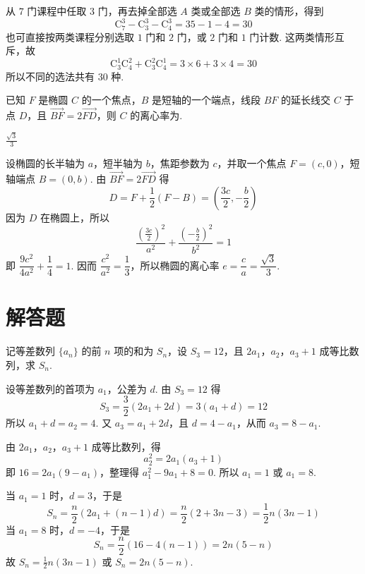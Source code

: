 \begin{solution}
从 \(7\) 门课程中任取 \(3\) 门，再去掉全部选 \(A\) 类或全部选 \(B\) 类的情形，得到
\[
\mathrm C_7^3-\mathrm C_3^3-\mathrm C_4^3=35-1-4=30
\]
也可直接按两类课程分别选取 \(1\) 门和 \(2\) 门，或 \(2\) 门和 \(1\) 门计数. 这两类情形互斥，故
\[
\mathrm C_3^1\mathrm C_4^2+\mathrm C_3^2\mathrm C_4^1=3\times6+3\times4=30
\]
所以不同的选法共有 \(30\) 种.
\end{solution}

\begin{problem}
已知 \(F\) 是椭圆 \(C\) 的一个焦点，\(B\) 是短轴的一个端点，线段 \(BF\) 的延长线交 \(C\) 于点 \(D\)，且 \( \overrightarrow{BF} = 2\overrightarrow{FD} \)，则 \(C\) 的离心率为\fillinblank{}.
\end{problem}

\begin{answer}
\(\frac{\sqrt{3}}{3}\)
\end{answer}

\begin{solution}
设椭圆的长半轴为 \(a\)，短半轴为 \(b\)，焦距参数为 \(c\)，并取一个焦点
\(F=(c,0)\)，短轴端点 \(B=(0,b)\). 由
\(\overrightarrow{BF}=2\overrightarrow{FD}\) 得
\[
D=F+\frac12(F-B)=\left(\frac{3c}{2},-\frac b2\right)
\]
因为 \(D\) 在椭圆上，所以
\[
\frac{\left(\frac{3c}{2}\right)^2}{a^2}
+\frac{\left(-\frac b2\right)^2}{b^2}=1
\]
即 \(\dfrac{9c^2}{4a^2}+\dfrac14=1\). 因而
\(\dfrac{c^2}{a^2}=\dfrac13\)，所以椭圆的离心率
\(e=\dfrac ca=\dfrac{\sqrt3}{3}\).
\end{solution}

\section{解答题}

\begin{problem}
记等差数列 \(\{a_{n}\}\) 的前 \(n\) 项的和为 \(S_{n}\)，设 \(S_{3} = 12\)，且 \(2a_{1}\)，\(a_{2}\)，\(a_{3} + 1\) 成等比数列，求 \(S_{n}\).
\end{problem}

\begin{solution}
设等差数列的首项为 \(a_1\)，公差为 \(d\). 由 \(S_3=12\) 得
\[
S_3=\frac32\left(2a_1+2d\right)=3(a_1+d)=12
\]
所以 \(a_1+d=a_2=4\). 又
\(a_3=a_1+2d\)，且 \(d=4-a_1\)，从而 \(a_3=8-a_1\).

由 \(2a_1\)，\(a_2\)，\(a_3+1\) 成等比数列，得
\[
a_2^2=2a_1(a_3+1)
\]
即 \(16=2a_1(9-a_1)\)，整理得 \(a_1^2-9a_1+8=0\).
所以 \(a_1=1\) 或 \(a_1=8\).

当 \(a_1=1\) 时，\(d=3\)，于是
\[
S_n=\frac n2\left(2a_1+(n-1)d\right)
=\frac n2\left(2+3n-3\right)
=\frac12n(3n-1)
\]
当 \(a_1=8\) 时，\(d=-4\)，于是
\[
S_n=\frac n2\left(16-4(n-1)\right)=2n(5-n)
\]
故 \(S_n=\frac12n(3n-1)\) 或 \(S_n=2n(5-n)\).
\end{solution}

